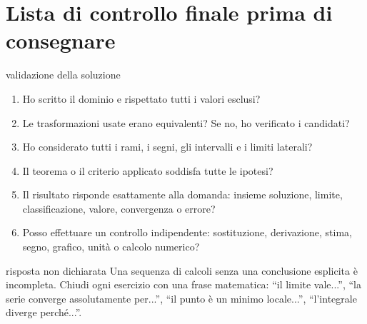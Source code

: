 \chapter*{Lista di controllo finale prima di consegnare}

\begin{controllofinale}{validazione della soluzione}
\begin{enumerate}
\item Ho scritto il dominio e rispettato tutti i valori esclusi?
\item Le trasformazioni usate erano equivalenti? Se no, ho verificato i candidati?
\item Ho considerato tutti i rami, i segni, gli intervalli e i limiti laterali?
\item Il teorema o il criterio applicato soddisfa tutte le ipotesi?
\item Il risultato risponde esattamente alla domanda: insieme soluzione, limite, classificazione, valore, convergenza o errore?
\item Posso effettuare un controllo indipendente: sostituzione, derivazione, stima, segno, grafico, unità o calcolo numerico?
\end{enumerate}
\end{controllofinale}

\begin{errorefrequente}{risposta non dichiarata}
Una sequenza di calcoli senza una conclusione esplicita è incompleta. Chiudi ogni esercizio con una frase matematica: ``il limite vale...'', ``la serie converge assolutamente per...'', ``il punto è un minimo locale...'', ``l'integrale diverge perché...''.
\end{errorefrequente}
